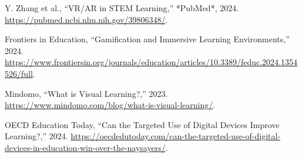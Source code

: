 \documentclass{thesis.cs.pub.ro}
\begin{document}
\begin{thebibliography}{99}
Y. Zhang et al., “VR/AR in STEM Learning,” *PubMed*, 2024. \href{https://pubmed.ncbi.nlm.nih.gov/39806348/}{https://pubmed.ncbi.nlm.nih.gov/39806348/}.

Frontiers in Education, “Gamification and Immersive Learning Environments,” 2024. \href{https://www.frontiersin.org/journals/education/articles/10.3389/feduc.2024.1354526/full}{https://www.frontiersin.org/journals/education/articles/10.3389/feduc.2024.1354526/full}.

Mindomo, “What is Visual Learning?,” 2023. \href{https://www.mindomo.com/blog/what-is-visual-learning/}{https://www.mindomo.com/blog/what-is-visual-learning/}.

OECD Education Today, “Can the Targeted Use of Digital Devices Improve Learning?,” 2024. \href{https://oecdedutoday.com/can-the-targeted-use-of-digital-devices-in-education-win-over-the-naysayers/}{https://oecdedutoday.com/can-the-targeted-use-of-digital-devices-in-education-win-over-the-naysayers/}.

\end{thebibliography}


\printindex
\end{document}
